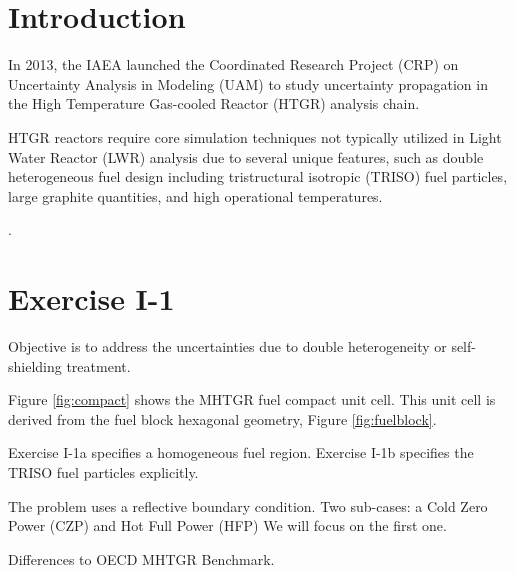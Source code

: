 \documentclass[11pt,letterpaper]{article}
\begin{document}

\section{Introduction}

In 2013, the IAEA launched the Coordinated Research Project (CRP) on Uncertainty Analysis in Modeling (UAM) to study uncertainty propagation in the High Temperature Gas-cooled Reactor (HTGR) analysis chain.

HTGR reactors require core simulation techniques not typically utilized in Light Water Reactor (LWR) analysis due to several unique features, such as double heterogeneous fuel design including tristructural isotropic (TRISO) fuel particles, large graphite quantities, and high operational temperatures.

\cite{bostelmann_criticality_2016}.

\section{Exercise I-1}

Objective is to address the uncertainties due to double heterogeneity or self-shielding treatment.

Figure \ref{fig:compact} shows the MHTGR fuel compact unit cell.
This unit cell is derived from the fuel block hexagonal geometry, Figure \ref{fig:fuelblock}.

Exercise I-1a specifies a homogeneous fuel region.
Exercise I-1b specifies the TRISO fuel particles explicitly.

The problem uses a reflective boundary condition.
Two sub-cases: a Cold Zero Power (CZP) and Hot Full Power (HFP)
We will focus on the first one.

Differences to OECD MHTGR Benchmark.
\end{document}
